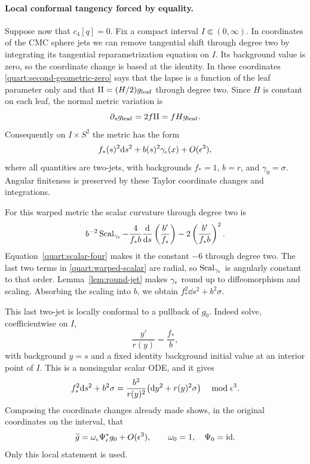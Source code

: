 \paragraph{Local conformal tangency forced by equality.}
Suppose now that \(c_4[q]=0\). Fix a compact interval
\(I\Subset(0,\infty)\).  In coordinates of the CMC sphere jets we can
remove tangential shift through degree two by integrating its
tangential reparametrization equation on \(I\).  Its background
value is zero, so the coordinate change is based at the identity.
In these coordinates \eqref{quart:second-geometric-zero} says that the
lapse is a function of the leaf parameter only and that
\(\mathrm{II}=(H/2)g_{\rm leaf}\) through degree two.  Since \(H\) is
constant on each leaf, the normal metric variation is
\[
 \partial_s g_{\rm leaf}=2f\mathrm{II}=fH g_{\rm leaf}.
\]
Consequently on \(I\times S^2\) the metric has the form
\begin{equation}
 f_*(s)^2\mathrm{d} s^2+b(s)^2\gamma_\epsilon(x)+O(\epsilon^3),
 \label{quart:warped-two}
\end{equation}
where all quantities are two-jets, with backgrounds \(f_*=1\),
\(b=r\), and \(\gamma_0=\sigma\).  Angular finiteness is preserved
by these Taylor coordinate changes and integrations.

For this warped metric the scalar curvature through degree two is
\begin{equation}
 b^{-2}\operatorname{Scal}_{\gamma_\epsilon}
   -\frac4{f_*b}\frac{\mathrm{d}}{\mathrm{d} s}
                      \left(\frac{b'}{f_*}\right)
   -2\left(\frac{b'}{f_*b}\right)^2.
 \label{quart:warped-scalar}
\end{equation}
Equation~\eqref{quart:scalar-four} makes it the constant \(-6\)
through degree two.  The last two terms in
\eqref{quart:warped-scalar} are radial, so
\(\operatorname{Scal}_{\gamma_\epsilon}\) is angularly constant to that order.
Lemma~\ref{lem:round-jet} makes \(\gamma_\epsilon\) round up to
diffeomorphism and scaling.  Absorbing the scaling into \(b\), we
obtain \(f_*^2\dd s^2+b^2\sigma\).

This last two-jet is locally conformal to a pullback of \(g_0\).
Indeed solve, coefficientwise on \(I\),
\begin{equation}
 \frac{y'}{r(y)}=\frac{f_*}{b},
 \label{quart:radial-coordinate}
\end{equation}
with background \(y=s\) and a fixed identity background initial value
at an interior point of \(I\).  This is a nonsingular scalar ODE,
and it gives
\[
 f_*^2\mathrm{d} s^2+b^2\sigma
   =\frac{b^2}{r(y)^2}
       \bigl(\mathrm{d} y^2+r(y)^2\sigma\bigr)
       \quad\bmod\epsilon^3.
\]
Composing the coordinate changes already made shows, in the original
coordinates on the interval, that
\begin{equation}
 \widetilde g=\omega_\epsilon\Psi_\epsilon^*g_0+O(\epsilon^3),
 \qquad \omega_0=1,\quad\Psi_0=\mathrm{id}.
 \label{quart:conformal-pullback}
\end{equation}
Only this local statement is used.

